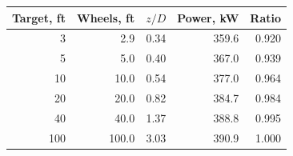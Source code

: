 \begin{tabular}{@{}rrrrr@{}}
\toprule
Target, ft & Wheels, ft & $z/D$ & Power, kW & Ratio \\
\midrule
3 & 2.9 & 0.34 & 359.6 & 0.920 \\
5 & 5.0 & 0.40 & 367.0 & 0.939 \\
10 & 10.0 & 0.54 & 377.0 & 0.964 \\
20 & 20.0 & 0.82 & 384.7 & 0.984 \\
40 & 40.0 & 1.37 & 388.8 & 0.995 \\
100 & 100.0 & 3.03 & 390.9 & 1.000 \\
\bottomrule
\end{tabular}
